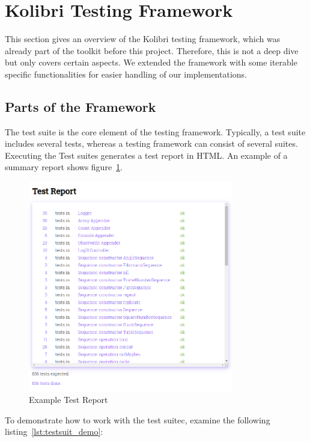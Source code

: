 \section{Kolibri Testing Framework}
\label{sec:Kolibri Test Framework}
This section gives an overview of the Kolibri testing framework, which was
already part of the toolkit before this project. Therefore, this is not a deep
dive but only covers certain aspects. We extended the framework with some
iterable specific functionalities for easier handling of our implementations.

\subsection{Parts of the Framework}
\label{sub:Parts of the Framework}
The test suite is the core element of the testing framework. Typically, a
test suite includes several tests, whereas a testing framework can consist of
several suites. Executing the Test suites generates a test report in HTML.
An example of a summary report shows figure~\ref{fig:test_report}.

\begin{figure}[H]
    \centering
    \includegraphics[width=0.8\textwidth]{mainmatter/pictures/test_report.png}
    \caption{Example Test Report}
    \label{fig:test_report}
\end{figure}


To demonstrate how to work with the test suitec, examine the following
listing~\ref{lst:testsuit_demo}:

